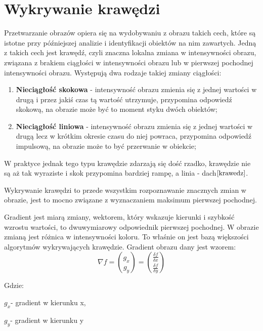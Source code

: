 \documentclass[eng,oneside]{mgr}
\begin{document}
\section{Wykrywanie krawędzi}
Przetwarzanie obrazów opiera się na wydobywaniu z obrazu takich cech, które są istotne przy późniejszej analizie i identyfikacji obiektów na nim zawartych. Jedną z takich cech jest krawędź, czyli znaczna lokalna zmiana w intensywności obrazu, związana z brakiem ciągłości w intensywności obrazu lub w pierwszej pochodnej intensywności obrazu. Występują dwa rodzaje takiej zmiany ciągłości:
\begin{enumerate}
\item \textbf{Nieciągłość skokowa} - intensywność obrazu zmienia się z jednej wartości w drugą i przez jakiś czas tą wartość utrzymuje, przypomina odpowiedź skokową, na obrazie może być to moment styku dwóch obiektów;
\item \textbf{Nieciągłość liniowa} - intensywność obrazu zmienia się z jednej wartości w drugą lecz w krótkim okresie czasu do niej powraca, przypomina odpowiedź impulsową, na obrazie może to być przerwanie w obiekcie; 
\end{enumerate}
\par W praktyce jednak tego typu krawędzie zdarzają się dość rzadko, krawędzie nie są aż tak wyraziste i skok przypomina bardziej rampę, a linia - dach$\cite{krawedz}$.

\par Wykrywanie krawędzi to przede wszystkim rozpoznawanie znacznych zmian w obrazie, jest to mocno związane z wyznaczaniem maksimum pierwszej pochodnej. 
\par Gradient jest miarą zmiany, wektorem, który wskazuje kierunki i szybkość wzrostu wartości, to dwuwymiarowy odpowiednik pierwszej pochodnej. W obrazie zmianą jest różnica w intensywności koloru. To właśnie on jest bazą większości algorytmów wykrywających krawędzie. Gradient obrazu dany jest wzorem:
\begin{equation}
\nabla f = \binom{g_x}{g_y} = \binom{\frac{\delta f}{\delta x}}{\frac{\delta f}{\delta y}}
\end{equation} 
\par Gdzie:
\par $g_x $- gradient w kierunku x,
\par $g_y $- gradient w kierunku y
\end{document}
